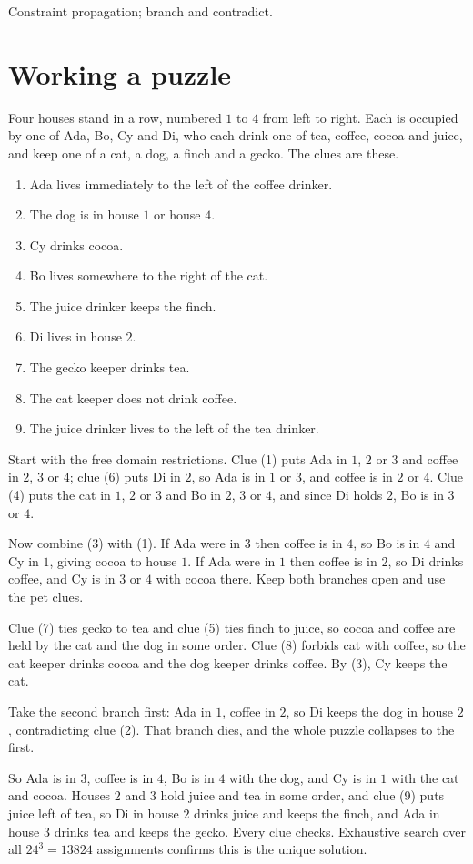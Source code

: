 \begin{seealsob}Constraint propagation; branch and contradict.\end{seealsob}

\section{Working a puzzle}

Four houses stand in a row, numbered $1$ to $4$ from left to right. Each is occupied by one of Ada, Bo, Cy and Di, who each drink one of tea, coffee, cocoa and juice, and keep one of a cat, a dog, a finch and a gecko. The clues are these.

\begin{enumerate}[label=(\arabic*),leftmargin=2.2em]
\item Ada lives immediately to the left of the coffee drinker.
\item The dog is in house $1$ or house $4$.
\item Cy drinks cocoa.
\item Bo lives somewhere to the right of the cat.
\item The juice drinker keeps the finch.
\item Di lives in house $2$.
\item The gecko keeper drinks tea.
\item The cat keeper does not drink coffee.
\item The juice drinker lives to the left of the tea drinker.
\end{enumerate}

\begin{worked}
Start with the free domain restrictions. Clue (1) puts Ada in $1$, $2$ or $3$ and coffee in $2$, $3$ or $4$; clue (6) puts Di in $2$, so Ada is in $1$ or $3$, and coffee is in $2$ or $4$. Clue (4) puts the cat in $1$, $2$ or $3$ and Bo in $2$, $3$ or $4$, and since Di holds $2$, Bo is in $3$ or $4$.

Now combine (3) with (1). If Ada were in $3$ then coffee is in $4$, so Bo is in $4$ and Cy in $1$, giving cocoa to house $1$. If Ada were in $1$ then coffee is in $2$, so Di drinks coffee, and Cy is in $3$ or $4$ with cocoa there. Keep both branches open and use the pet clues.

Clue (7) ties gecko to tea and clue (5) ties finch to juice, so cocoa and coffee are held by the cat and the dog in some order. Clue (8) forbids cat with coffee, so the cat keeper drinks cocoa and the dog keeper drinks coffee. By (3), Cy keeps the cat.

Take the second branch first: Ada in $1$, coffee in $2$, so Di keeps the dog in house $2$, contradicting clue (2). That branch dies, and the whole puzzle collapses to the first.

So Ada is in $3$, coffee is in $4$, Bo is in $4$ with the dog, and Cy is in $1$ with the cat and cocoa. Houses $2$ and $3$ hold juice and tea in some order, and clue (9) puts juice left of tea, so Di in house $2$ drinks juice and keeps the finch, and Ada in house $3$ drinks tea and keeps the gecko. Every clue checks. Exhaustive search over all $24^{3}=13824$ assignments confirms this is the unique solution.
\end{worked}

